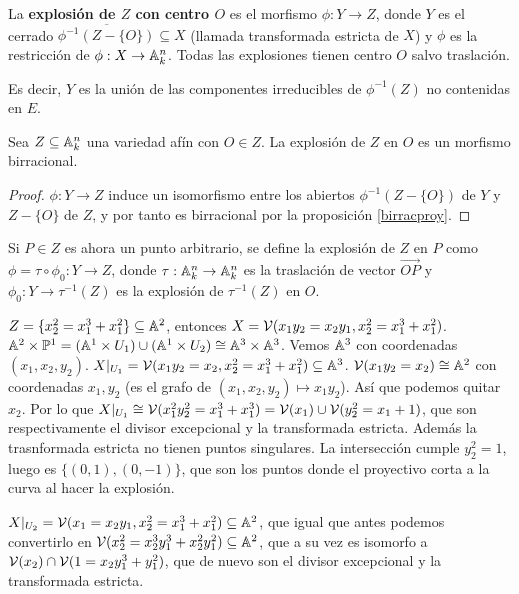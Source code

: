 \documentclass[ACGA.tex]{subfiles}
\begin{document}
\begin{defi}
 La {\bf explosión de $Z$ con centro $O$} es el morfismo $\phi:Y\to Z$, donde $Y$ es el cerrado $\overline{\phi^{-1}(Z-\{O\})}\subseteq X$ (llamada transformada estricta de $X$) y $\phi$ es la restricción de $\phi:X\to\mathbb{A}^n_k$. Todas las explosiones tienen centro $O$ salvo traslación.
\end{defi}

Es decir, $Y$ es la unión de las componentes irreducibles de $\phi^{-1}(Z)$ no contenidas en $E$. 

\begin{prop}
 Sea $Z\subseteq\mathbb{A}^n_k$ una variedad afín con $O\in Z$. La explosión de $Z$ en $O$ es un morfismo birracional.
\end{prop}

\begin{proof}
 $\phi:Y\to Z$ induce un isomorfismo entre los abiertos $\phi^{-1}(Z-\{O\})$ de $Y$ y $Z-\{O\}$ de $Z$, y por tanto es birracional por la proposición \ref{birracproy}.
\end{proof}

Si $P\in Z$ es ahora un punto arbitrario, se define la explosión de $Z$ en $P$ como $\phi=\tau\circ\phi_0:Y\to Z$, donde $\tau:\mathbb{A}^n_k\to\mathbb{A}^n_k$ es la traslación de vector $\overrightarrow{OP}$ y $\phi_0:Y\to\tau^{-1}(Z)$ es la explosión de $\tau^{-1}(Z)$ en $O$.

\begin{ej}
$Z=\{x_2^2=x_1^3+x_1^2\}\subseteq\mathbb{A}^2$, entonces $X=\mathcal{V}(x_1y_2=x_2y_1,x_2^2=x_1^3+x_1^2)$. $\mathbb{A}^2\times\mathbb{P}^1=(\mathbb{A}^1\times U_1)\cup(\mathbb{A}^1\times U_2)\cong \mathbb{A}^3\times\mathbb{A}^3$. Vemos $\mathbb{A}^3$ con coordenadas $(x_1,x_2,y_2)$. $X|_{U_1}=\mathcal{V}(x_1y_2=x_2,x_2^2=x_1^3+x_1^2)\subseteq\mathbb{A}^3$. $\mathcal{V}(x_1y_2=x_2)\cong\mathbb{A}^2$ con coordenadas $x_1,y_2$ (es el grafo de $(x_1,x_2,y_2)\mapsto x_1y_2$). Así que podemos quitar $x_2$. Por lo que $X|_{U_1}\cong \mathcal{V}(x_1^2y_2^2=x_1^3+x_1^3)=\mathcal{V}(x_1)\cup \mathcal{V}(y_2^2=x_1+1)$, que son respectivamente el divisor excepcional y la transformada estricta. Además la trasnformada estricta no tienen puntos singulares. La intersección cumple $y_2^2=1$, luego es $\{(0,1),(0,-1)\}$, que son los puntos donde el proyectivo corta a la curva al hacer la explosión.

$X|_{U_2}=\mathcal{V}(x_1=x_2y_1,x_2^2=x_1^3+x_1^2)\subseteq\mathbb{A}^2$, que igual que antes podemos convertirlo en $\mathcal{V}(x_2^2=x_2^3y_1^3+x_2^2y_1^2)\subseteq\mathbb{A}^2$, que a su vez es isomorfo a $\mathcal{V}(x_2)\cap\mathcal{V}(1=x_2y_1^3+y_1^2)$, que de nuevo son el divisor excepcional y la transformada estricta.
\end{ej}
\end{document}
